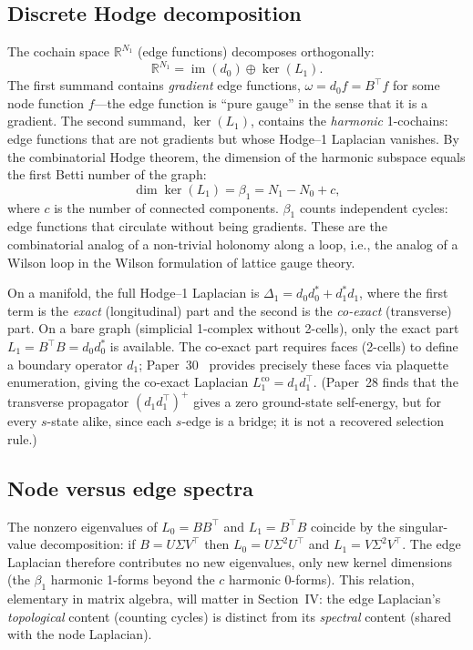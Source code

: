 \documentclass[aps,pra,twocolumn,superscriptaddress,longbibliography]{revtex4-2}
\begin{document}
\subsection{Discrete Hodge decomposition}

The cochain space $\mathbb{R}^{N_1}$ (edge functions) decomposes
orthogonally:
\begin{equation}
\mathbb{R}^{N_1} = \operatorname{im}(d_0) \oplus \ker(L_1).
\label{eq:hodge_decomp}
\end{equation}
The first summand contains \emph{gradient} edge functions,
$\omega = d_0 f = B^{\top} f$ for some node function $f$---the edge
function is ``pure gauge'' in the sense that it is a gradient.  The
second summand, $\ker(L_1)$, contains the \emph{harmonic} 1-cochains:
edge functions that are not gradients but whose Hodge--1 Laplacian
vanishes.  By the combinatorial Hodge theorem, the dimension of the
harmonic subspace equals the first Betti number of the graph:
\begin{equation}
\dim \ker(L_1) = \beta_1 = N_1 - N_0 + c,
\label{eq:betti1}
\end{equation}
where $c$ is the number of connected components.  $\beta_1$ counts
independent cycles: edge functions that circulate without being
gradients.  These are the combinatorial analog of a non-trivial
holonomy along a loop, i.e., the analog of a Wilson loop in the
Wilson formulation of lattice gauge theory.

On a manifold, the full Hodge--1 Laplacian is
$\Delta_1 = d_0 d_0^* + d_1^* d_1$, where the first term is the
\emph{exact} (longitudinal) part and the second is the
\emph{co-exact} (transverse) part.  On a bare graph (simplicial
1-complex without 2-cells), only the exact part
$L_1 = B^\top B = d_0 d_0^*$ is available.  The co-exact part requires
faces (2-cells) to define a boundary operator $d_1$;
Paper~30~\cite{paper30} provides precisely these faces via plaquette
enumeration, giving the co-exact Laplacian
$L_1^{\mathrm{co}} = d_1 d_1^\top$.  (Paper~28 finds that the
transverse propagator $(d_1 d_1^\top)^+$ gives a zero ground-state
self-energy, but for every $s$-state alike, since each $s$-edge is a
bridge; it is not a recovered selection rule.)

\subsection{Node versus edge spectra}

The nonzero eigenvalues of $L_0 = B B^{\top}$ and $L_1 = B^{\top} B$
coincide by the singular-value decomposition: if $B = U \Sigma V^{\top}$
then $L_0 = U \Sigma^2 U^{\top}$ and $L_1 = V \Sigma^2 V^{\top}$.
The edge Laplacian therefore contributes no new eigenvalues, only new
kernel dimensions (the $\beta_1$ harmonic 1-forms beyond the
$c$ harmonic 0-forms).  This relation, elementary in matrix algebra,
will matter in Section~IV: the edge Laplacian's \emph{topological}
content (counting cycles) is distinct from its \emph{spectral}
content (shared with the node Laplacian).
\end{document}
